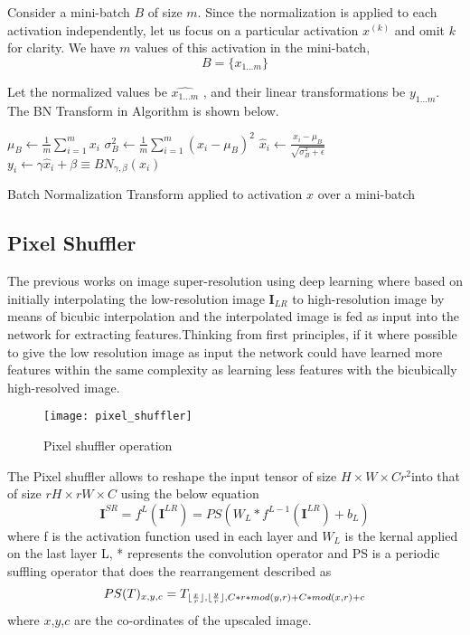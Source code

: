 Consider a mini-batch $B$ of size $m$. Since the normalization is applied to each activation independently, let us focus on a particular activation $x^{(k)}$ and omit $k$ for clarity. We have $m$ values of this activation in the mini-batch,
\begin{equation}
 B = \{x_{1 \dots m}\}
\end{equation}

Let the normalized values be $\hat{x_{1 \dots m }}$ , and their linear transformations  be $y_{1 \dots m}$. The BN Transform in Algorithm is shown below.

\begin{algorithm}[H]
\DontPrintSemicolon
{}
$\mu_B \leftarrow \frac{1}{m}\sum_{i=1}^{m}x_i$
$\sigma_B^2 \leftarrow \frac{1}{m}\sum_{i=1}^{m}(x_i - \mu_B)^2$  
$\hat x_i \leftarrow \frac{x_i - \mu_B}{\sqrt{\sigma_B^2 + \epsilon}}$  
$y_i \leftarrow \gamma\hat x_i + \beta \equiv BN_{\gamma,\beta}(x_i) $  
\caption{Batch Normalization Transform applied to activation $x$ over a mini-batch}
\label{algo:batchnorm}
\end{algorithm}

\subsection{Pixel Shuffler}
The previous works on image super-resolution using deep learning  where based on initially interpolating the low-resolution image $\textbf{I}_{LR}$ to high-resolution image by means of bicubic interpolation and the interpolated image is fed as input into the network for extracting features.Thinking from first principles, if it where possible to give the low resolution image as input the network could have learned more features within the same complexity as learning less features with the bicubically high-resolved image.
\begin{figure}[h!]
 \centering
 \texttt{[image: pixel\_shuffler]}
 \caption{Pixel shuffler operation}
 \label{fig:pixelshuffler}
\end{figure}

The Pixel shuffler allows to reshape the input tensor of size $ H \times W \times Cr^2 $into that of size $rH \times rW \times C$ using the below equation
\begin{equation}
\textbf{I}^{SR} = f^L(\textbf{I}^{LR}) = PS(W_L * f^{L-1}(\textbf{I}^{LR}) + b_L)
\end{equation}
where f is the activation function used in each layer and $W_L$ is the kernal applied on the last layer L, * represents the convolution operator and  PS is a periodic suffling operator that does the rearrangement described as
\begin{equation}
PS(T)_{x,y,c} = T_{\lfloor\frac{x}{r}\rfloor,\lfloor\frac{y}{r}\rfloor,C*r*mod(y,r) + C*mod(x,r)+c}
\end{equation}
where $x$,$y$,$c$ are the co-ordinates of the upscaled image.